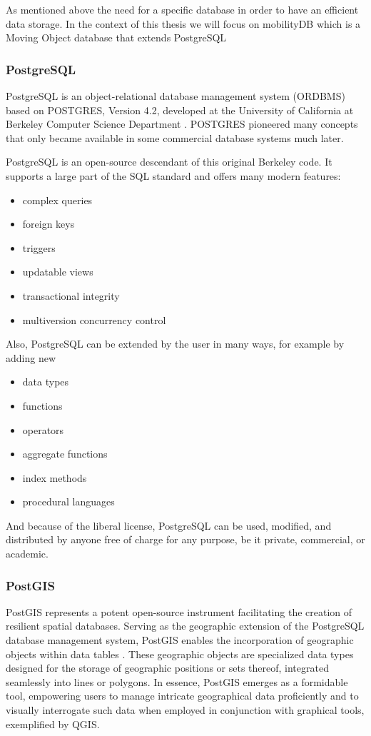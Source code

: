 \documentclass[twoside,12pt, a4paper]{report}
\begin{document}
As mentioned above the need for a specific database in order to have an efficient data storage.
In the context of this thesis we will focus on mobilityDB which is a Moving Object database that extends
PostgreSQL

\subsubsection{PostgreSQL}

PostgreSQL is an object-relational database management system (ORDBMS) based on POSTGRES, Version 4.2,
developed at the University of California at Berkeley Computer Science Department \cite{postgresql}. POSTGRES pioneered many
concepts that only became available in some commercial database systems much later.

PostgreSQL is an open-source descendant of this original Berkeley code. It supports a large part of the SQL standard
and offers many modern features:

\begin{itemize}
	
	\item complex queries
	\item foreign keys
	\item triggers
	\item updatable views
	\item transactional integrity
	\item multiversion concurrency control
\end{itemize}

Also, PostgreSQL can be extended by the user in many ways, for example by adding new

\begin{itemize}
	\item data types
	\item functions
	\item operators
	\item aggregate functions
	\item index methods
	\item procedural languages
\end{itemize}
And because of the liberal license, PostgreSQL can be used, modified, and distributed by anyone free of charge for any purpose, be it private, commercial, or academic.


\subsubsection{PostGIS}
PostGIS represents a potent open-source instrument facilitating the creation of resilient spatial databases. Serving as the geographic extension of the PostgreSQL database management system, PostGIS enables the incorporation of geographic objects within data tables \cite{marquez2015postgis}. These geographic objects are specialized data types designed for the storage of geographic positions or sets thereof, integrated seamlessly into lines or polygons. In essence, PostGIS emerges as a formidable tool, empowering users to manage intricate geographical data proficiently and to visually interrogate such data when employed in conjunction with graphical tools, exemplified by QGIS.
\end{document}
